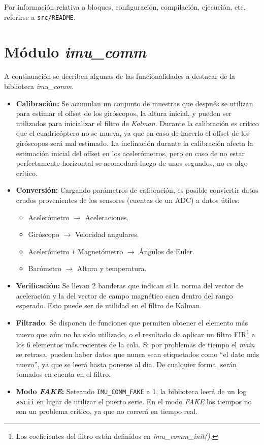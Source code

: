 \documentclass[main]{subfiles}
\begin{document}
Por información relativa a bloques, configuración, compilación, ejecución, etc, referirse a \verb+src/README+.

\section{M\'odulo \textit{imu\_comm}}
\label{sec:software:imu-comm}

A continuaci\'on se decriben algunas de las funcionalidades a destacar de la biblioteca \textit{imu\_comm}.

\begin{itemize}
\item \textbf{Calibración:} Se acumulan un conjunto de muestras que después se utilizan para estimar el offset de los giróscopos, la altura inicial, y pueden ser utilizados para inicializar el filtro de \textit{Kalman}. Durante la calibraci\'on es cr\'itico que el cuadric\'optero no se mueva, ya que en caso de hacerlo el offset de los gir\'oscopos ser\'a mal estimado.\newline
La inclinaci\'on durante la calibraci\'on afecta la estimaci\'on inicial del offset en los aceler\'ometros, pero en caso de no estar perfectamente horizontal se acomodar\'a luego de unos segundos, no es algo cr\'itico.
\item \textbf{Conversión:} Cargando parámetros de calibración, es posible conviertir datos crudos provenientes de los sensores (cuentas de un ADC) a datos útiles:
  \begin{itemize}
  \item Aceler\'ometro $\rightarrow$ Aceleraciones.
  \item Gir\'oscopo $\rightarrow$ Velocidad angulares.
  \item Aceler\'ometro \verb~+~ Magnet\'ometro  $\rightarrow$ \'Angulos de Euler.
  \item Bar\'ometro $\rightarrow$ Altura y temperatura.
  \end{itemize}

\item \textbf{Verificaci\'on:} Se llevan 2 banderas que indican si la norma del vector de aceleraci\'on y la del vector de campo magn\'etico caen dentro del rango esperado. Esto puede ser de utilidad en el filtro de Kalman.

\item \textbf{Filtrado}: Se disponen de funciones que permiten obtener el elemento m\'as nuevo que a\'un no ha sido utilizado, o el resultado de aplicar un filtro FIR\footnote{Los coeficientes del filtro est\'an definidos en \textit{imu\_comm\_init()}.} a los 6 elementos m\'as recientes de la cola. Si por problemas de tiempo el \textit{main} se retrasa, pueden haber datos que nunca sean etiquetados como ``el dato m\'as nuevo'', ya que se leer\'a hasta ponerse al dia. De cualquier forma, ser\'an tomados en cuenta en el filtro.

\item \textbf{Modo \textit{FAKE}:} Seteando \verb+IMU_COMM_FAKE+ a 1, la biblioteca leerá de un log \verb+ascii+ en lugar de utilizar el puerto serie. En el modo \textit{FAKE} los tiempos no son un problema cr\'itico, ya que no correr\'a en tiempo real.
\end{itemize}
\end{document}
